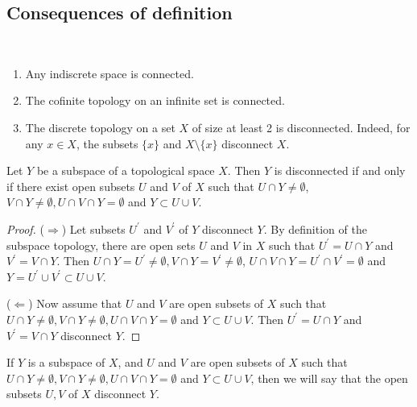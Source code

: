 \documentclass[a4paper]{article}
\begin{document}
\subsection{Consequences of definition}\ \vspace{-1.5em}

\begin{example}
    \begin{enumerate}
        \item Any indiscrete space is connected.
      
        \item The cofinite topology on an infinite set is connected.
      
        \item The discrete topology on a set $X$ of size at least 2 is disconnected. Indeed, for any $x \in X$, the subsets $\{x\}$ and $X \setminus\{x\}$ disconnect $X$.
      
      \end{enumerate}
\end{example}

\begin{lemma}
    Let $Y$ be a subspace of a topological space $X$. Then $Y$ is disconnected if and only if there exist open subsets $U$ and $V$ of $X$ such that $U \cap Y \neq \emptyset$, $V \cap Y \neq \emptyset, U \cap V \cap Y=\emptyset$ and $Y \subset U \cup V$.
\end{lemma}
\begin{proof}
    ($ \Rightarrow $) Let subsets $U^{\prime}$ and $V^{\prime}$ of $Y$ disconnect $Y$. By definition of the subspace topology, there are open sets $U$ and $V$ in $X$ such that $U^{\prime}=U \cap Y$ and $V^{\prime}=V \cap Y$. Then $U \cap Y=U^{\prime} \neq \emptyset, V \cap Y=V^{\prime} \neq \emptyset$, $U \cap V \cap Y=U^{\prime} \cap V^{\prime}=\emptyset$ and $Y=U^{\prime} \cup V^{\prime} \subset U \cup V$.

    ($ \Leftarrow $) Now assume that $U$ and $V$ are open subsets of $X$ such that $U \cap Y \neq \emptyset, V \cap Y \neq \emptyset, U \cap V \cap Y=\emptyset$ and $Y \subset U \cup V$. Then $U^{\prime}=U \cap Y$ and $V^{\prime}=V \cap Y$ disconnect $Y$.
\end{proof}

\begin{note}
    If $Y$ is a subspace of $X$, and $U$ and $V$ are open subsets of $X$ such that $U \cap Y \neq \emptyset, V \cap Y \neq \emptyset, U \cap V \cap Y=\emptyset$ and $Y \subset U \cup V$, then we will say that the open subsets $U, V$ of $X$ disconnect $Y$.
\end{note}
\end{document}
